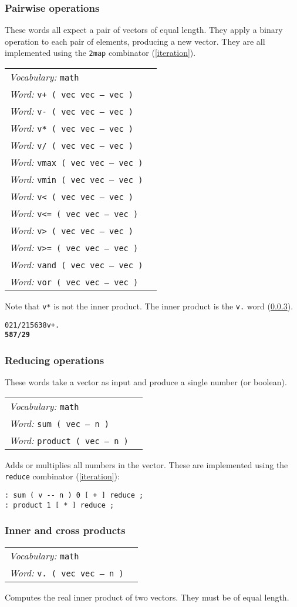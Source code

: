 \documentclass{book}
\newcommand{\tto}{\symbol{123}}
\newcommand{\ttc}{\symbol{125}}
\newcommand{\vocabulary}[1]{\emph{Vocabulary:} \texttt{#1}&\\}
\newcommand{\ordinaryword}[2]{\index{\texttt{#1}}\emph{Word:} \texttt{#2}&\\}
\newcommand{\wordtable}[1]{


\begin{tabularx}{12cm}{lX}
\hline
#1
\hline
\end{tabularx}

}
\begin{document}
\subsubsection{Pairwise operations}\label{pairwise}

These words all expect a pair of vectors of equal length. They apply a binary operation to each pair of elements, producing a new vector. They are all implemented using the \verb|2map| combinator (\ref{iteration}).

\wordtable{
\vocabulary{math}
\ordinaryword{v+}{v+ ( vec vec -- vec )}
\ordinaryword{v-}{v-~( vec vec -- vec )}
\ordinaryword{v*}{v*~( vec vec -- vec )}
\ordinaryword{v/}{v/~( vec vec -- vec )}
\ordinaryword{vmax}{vmax~( vec vec -- vec )}
\ordinaryword{vmin}{vmin~( vec vec -- vec )}
\ordinaryword{v<}{v<~( vec vec -- vec )}
\ordinaryword{v<=}{v<=~( vec vec -- vec )}
\ordinaryword{v>}{v>~( vec vec -- vec )}
\ordinaryword{v>=}{v>=~( vec vec -- vec )}
\ordinaryword{vand}{vand~( vec vec -- vec )}
\ordinaryword{vor}{vor~( vec vec -- vec )}
}

Note that \verb|v*| is not the inner product. The inner product is the \verb|v.| word (\ref{inner-product}).

\begin{alltt}
  \tto 0 2 1/2 1 \ttc \tto 5 6 3 8 \ttc v+ .
\textbf{\tto 5 8 7/2 9 \ttc}
\end{alltt}

\subsubsection{Reducing operations}\label{reductions}

These words take a vector as input and produce a single number (or boolean).

\wordtable{
\vocabulary{math}
\ordinaryword{sum}{sum~( vec -- n )}
\ordinaryword{product}{product~( vec -- n )}
}

Adds or multiplies all numbers in the vector. These are implemented using the \verb|reduce| combinator (\ref{iteration}):
\begin{verbatim}
: sum ( v -- n ) 0 [ + ] reduce ;
: product 1 [ * ] reduce ;
\end{verbatim}

\subsubsection{Inner and cross products}\label{inner-product}

\wordtable{
\vocabulary{math}
\ordinaryword{v.}{v.~( vec vec -- n )}
}
Computes the real inner product of two vectors. They must be of equal length.
\end{document}
